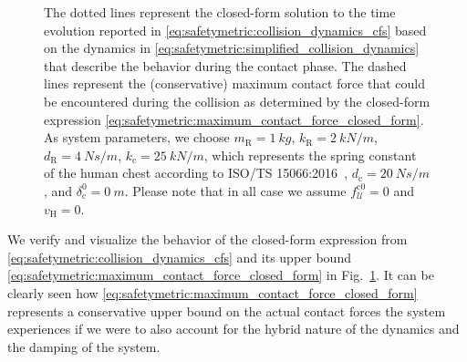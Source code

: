 \begin{figure}[ht]
{        The dotted lines represent the closed-form solution to the time evolution reported in \eqref{eq:safetymetric:collision_dynamics_cfs} based on the dynamics in \eqref{eq:safetymetric:simplified_collision_dynamics} that describe the behavior during the contact phase. The dashed lines represent the (conservative) maximum contact force that could be encountered during the collision as determined by the closed-form expression \eqref{eq:safetymetric:maximum_contact_force_closed_form}. 
        As system parameters, we choose $m_\mathrm{R} = \SI{1}{kg}$, $k_\mathrm{R} = \SI{2}{kN \per m}$, $d_\mathrm{R} = \SI{4}{Ns \per m}$, $k_\mathrm{c} = \SI{25}{kN \per m}$, which represents the spring constant of the human chest according to ISO/TS 15066:2016~\citep{iso2016collaborative}, $d_\mathrm{c} = \SI{20}{Ns \per m}$, and $\delta_\mathrm{c}^0 = \SI{0}{m}$.
        Please note that in all case we assume $f_{\mathcal{U}}^{\mathrm{c}0} = 0$ and $v_\mathrm{H} = 0$.
    }
    \label{fig:safetymetric:closed_form_solution_verification}
\end{figure}

We verify and visualize the behavior of the closed-form expression from \eqref{eq:safetymetric:collision_dynamics_cfs} and its upper bound \eqref{eq:safetymetric:maximum_contact_force_closed_form} in Fig.~\ref{fig:safetymetric:closed_form_solution_verification}. It can be clearly seen how \eqref{eq:safetymetric:maximum_contact_force_closed_form} represents a conservative upper bound on the actual contact forces the system experiences if we were to also account for the hybrid nature of the dynamics and the damping of the system.

